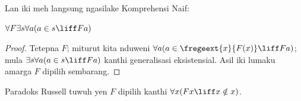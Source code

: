 \documentclass[../../../include/open-logic-section]{subfiles}
\begin{document}
Lan iki meh langsung ngasilake Komprehensi Naif:

\begin{lem}
$\forall F \exists s \forall a (a \in s \liff Fa)$
\end{lem}

\begin{proof}
Tetepna $F$; miturut  kita nduweni
$\forall a (a \in \fregeext{x}{F(x)} \liff Fa)$; mula
$\exists s\forall a(a \in s \liff Fa)$ kanthi generalisasi
eksistensial. Asil iki lumaku amarga $F$ dipilih sembarang.
\end{proof}

Paradoks Russell tuwuh yen $F$ dipilih kanthi
$\forall x(Fx \liff x \notin x)$.
\end{document}
